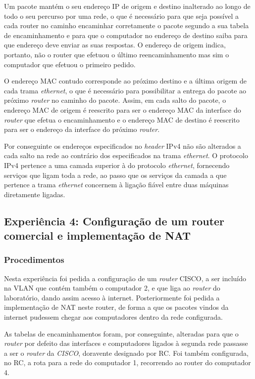 \documentclass{article}
\begin{document}
Um pacote  mantém o seu endereço IP de origem e destino inalterado ao longo de todo o seu percurso por uma rede, o que é necessário para que seja possível a cada router no caminho encaminhar corretamente o pacote segundo a sua tabela de encaminhamento e para que o computador no endereço de destino saiba para que endereço deve enviar as suas respostas. O endereço de origem indica, portanto, não o router que efetuou o último reencaminhamento mas sim o computador que efetuou o primeiro pedido.

O endereço MAC contudo corresponde ao próximo destino e a última origem de cada trama \textit{ethernet}, o que é necessário para possibilitar a entrega do pacote ao próximo \textit{router} no caminho do pacote. Assim, em cada salto do pacote, o endereço MAC de origem é reescrito para ser o endereço MAC da interface do  \textit{router} que efetua o encaminhamento e o endereço MAC de destino é reescrito para ser o endereço da interface do próximo \textit{router}.

Por conseguinte os endereços especificados no \textit{header} IPv4 não são alterados a cada salto na rede ao contrário dos especificados na trama \textit{ethernet}. O protocolo IPv4 pertence a uma camada superior à do protocolo \textit{ethernet}, fornecendo serviços que ligam toda a rede, ao passo que os serviços da camada a que pertence a trama \textit{ethernet} concernem à ligação fiável entre duas máquinas diretamente ligadas.
\newpage
\subsection{Experiência 4: Configuração de um router comercial e implementação de NAT}

\subsubsection{Procedimentos}
Nesta experiência foi pedida a configuração de um \textit{router} CISCO, a ser incluído na VLAN que contém também o computador 2, e que liga ao \textit{router} do laboratório, dando assim acesso à internet. Posteriormente foi pedida a implementação de NAT neste router, de forma a que os pacotes vindos da internet pudessem chegar aos computadores dentro da rede configurada. 

As tabelas de encaminhamentos foram, por conseguinte, alteradas para que o \textit{router} por defeito das interfaces e computadores ligados à segunda rede passasse a ser o \textit{router} da \textit{CISCO}, doravente designado por RC. Foi também configurada, no RC, a rota para a rede do computador 1, recorrendo ao router do computador 4.
\end{document}
